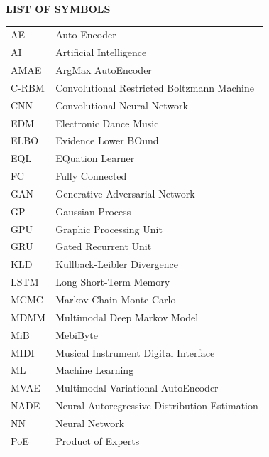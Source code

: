 \documentclass[12pt]{report}
\begin{document}
\newpage
\begin{center}
    \textbf{\Large LIST OF SYMBOLS}\\
    \vspace{2cm}
    \begin{longtable}{ll}
        AE & Auto Encoder \\
        AI & Artificial Intelligence \\
        AMAE & ArgMax AutoEncoder \\
        C-RBM & Convolutional Restricted Boltzmann Machine \\
        CNN & Convolutional Neural Network \\
        EDM & Electronic Dance Music \\
        ELBO & Evidence Lower BOund \\
        EQL & EQuation Learner \\
        FC & Fully Connected \\
        GAN & Generative Adversarial Network \\
        GP & Gaussian Process \\
        GPU & Graphic Processing Unit \\
        GRU & Gated Recurrent Unit \\
        KLD & Kullback-Leibler Divergence \\
        LSTM & Long Short-Term Memory \\
        MCMC & Markov Chain Monte Carlo \\
        MDMM & Multimodal Deep Markov Model \\
        MiB & MebiByte \\
        MIDI & Musical Instrument Digital Interface \\
        ML & Machine Learning \\
        MVAE & Multimodal Variational AutoEncoder \\
        NADE & Neural Autoregressive Distribution Estimation \\
        NN & Neural Network \\
        PoE & Product of Experts \\

\end{longtable}
\end{center}
\end{document}
